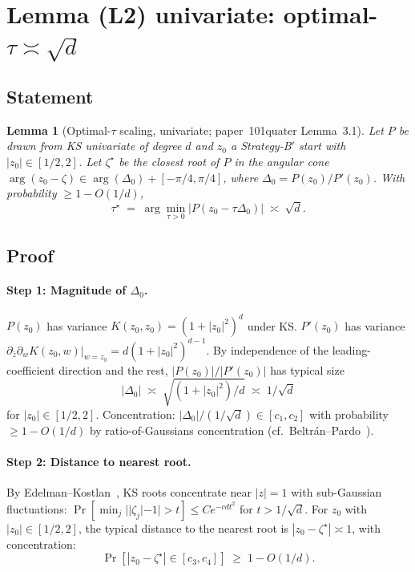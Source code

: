 \documentclass[11pt,a4paper]{article}
\newtheorem{lemma}[theorem]{Lemma}
\begin{document}
\section{Lemma (L2) univariate: optimal-$\tau \asymp \sqrt d$}\label{sec:tau-univariate}

\subsection{Statement}

\begin{lemma}[Optimal-$\tau$ scaling, univariate; paper~101quater Lemma~3.1]\label{lem:tau-univariate}
Let $P$ be drawn from KS univariate of degree $d$ and $z_0$ a Strategy-B$'$ start with $|z_0| \in [1/2, 2]$. Let $\zeta^\star$ be the closest root of $P$ in the angular cone $\arg(z_0 - \zeta) \in \arg(\Delta_0) + [-\pi/4, \pi/4]$, where $\Delta_0 = P(z_0)/P'(z_0)$. With probability $\ge 1 - O(1/d)$,
\begin{equation}\label{eq:tau-univ}
\tau^\star \;=\; \arg\min_{\tau > 0}|P(z_0 - \tau \Delta_0)| \;\asymp\; \sqrt d.
\end{equation}
\end{lemma}

\subsection{Proof}

\paragraph{Step 1: Magnitude of $\Delta_0$.}
$P(z_0)$ has variance $K(z_0, z_0) = (1 + |z_0|^2)^d$ under KS. $P'(z_0)$ has variance $\partial_{\bar z}\partial_w K(z_0, w)|_{w = z_0} = d(1 + |z_0|^2)^{d-1}$. By independence of the leading-coefficient direction and the rest, $|P(z_0)|/|P'(z_0)|$ has typical size
$$
|\Delta_0| \;\asymp\; \sqrt{(1+|z_0|^2)/d} \;\asymp\; 1/\sqrt d
$$
for $|z_0| \in [1/2, 2]$. Concentration: $|\Delta_0|/(1/\sqrt d) \in [c_1, c_2]$ with probability $\ge 1 - O(1/d)$ by ratio-of-Gaussians concentration (cf.\ Beltr\'an--Pardo~\cite[Prop.~2.3]{beltranpardo}).

\paragraph{Step 2: Distance to nearest root.}
By Edelman--Kostlan~\cite{edelmankostlan}, KS roots concentrate near $|z| = 1$ with sub-Gaussian fluctuations: $\Pr[\min_j ||\zeta_j| - 1| > t] \le C e^{-cd t^2}$ for $t > 1/\sqrt d$. For $z_0$ with $|z_0| \in [1/2, 2]$, the typical distance to the nearest root is $|z_0 - \zeta^\star| \asymp 1$, with concentration:
$$
\Pr[|z_0 - \zeta^\star| \in [c_3, c_4]] \;\ge\; 1 - O(1/d).
$$
\end{document}

